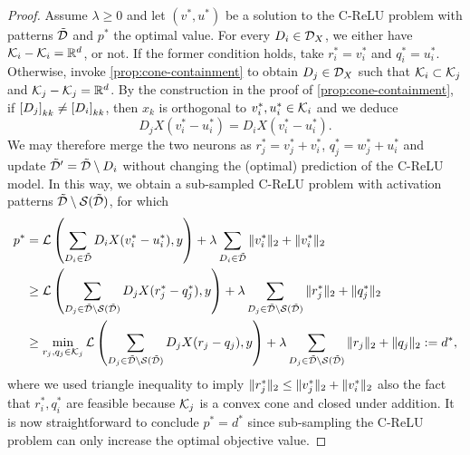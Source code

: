 \begin{proof}
    Assume \( \lambda \geq 0 \) and let \( (v^*, u^*) \) be a solution to the
    C-ReLU problem with patterns \( \tilde{\mathcal{D}} \) and \( p^* \) the optimal
    value.
    For every \( D_i \in \mathcal{D}_{X} \), we either have \( \mathcal{K}_i - \mathcal{K}_i = \mathbb{R}^d \), or not.
    If the former condition holds, take \( r_i^* = v_i^* \) and \( q_i^* = u_i^* \).
    Otherwise, invoke \cref{prop:cone-containment} to obtain \( D_j \in \mathcal{D}_{X} \)
    such that \( \mathcal{K}_i \subset \mathcal{K}_j \) and \( \mathcal{K}_j - \mathcal{K}_j = \mathbb{R}^d \).
    By the construction in the proof of \cref{prop:cone-containment},
    if \( \left[D_j\right]_{kk} \neq \left[D_i\right]_{kk} \),
    then \( x_k \) is orthogonal to \( v_i^*, u_i^* \in \mathcal{K}_i \) and we deduce
    \[
        D_j X (v_i^* - u_i^*)  = D_i X (v_i^* - u_i^*).
    \]
    We may therefore merge the two neurons as \( r^*_j = v^*_j + v^*_i \),
    \( q_j^* = w_j^* + u_i^* \) and update
    \( \tilde {\mathcal{D}}' = \tilde {\mathcal{D}} \setminus D_i \) without changing the
    (optimal) prediction of the C-ReLU model.
    In this way, we obtain a sub-sampled C-ReLU problem with activation patterns
    \( \tilde {\mathcal{D}} \setminus \mathcal{S}(\tilde {\mathcal{D}}) \),
    for which
    \begin{align*}
        p^* & = \mathcal{L}\left(\sum_{D_i \in \tilde {\mathcal{D}}} D_i X (v_i^* - u_i^*), y\right)
        + \lambda \sum_{D_i \in \tilde {\mathcal{D}}} \|v_i^*\|_2 + \|v_i^*\|_2
        \\
            & \geq \mathcal{L}\left(\sum_{D_j \in \tilde {\mathcal{D}} \setminus \mathcal{S}(\tilde {\mathcal{D}})} D_j X (r_j^* - q_j^*), y\right)
        + \lambda \sum_{D_j \in \tilde {\mathcal{D}} \setminus \mathcal{S}(\tilde {\mathcal{D}})} \|r_j^*\|_2 + \|q_j^*\|_2                              \\
            & \geq \min_{r_j, q_j \in \mathcal{K}_j} \mathcal{L}\left(\sum_{D_j \in \tilde {\mathcal{D}} \setminus \mathcal{S}(\tilde {\mathcal{D}})} D_j X (r_j - q_j), y\right)
        + \lambda \sum_{D_j \in \tilde {\mathcal{D}} \setminus \mathcal{S}(\tilde {\mathcal{D}})} \|r_j\|_2 + \|q_j\|_2
        := d^*,
    \end{align*}
    where we used triangle inequality to imply \( \|r_j^*\|_2 \leq
    \|v_j^*\|_2 + \|v_i^*\|_2 \) also the fact that \( r_i^*, q_i^* \)
    are feasible because \( \mathcal{K}_j \) is a convex cone and closed under
    addition.
    It is now straightforward to conclude \( p^* = d^* \) since sub-sampling
    the C-ReLU problem can only increase the optimal objective value.
\end{proof}

